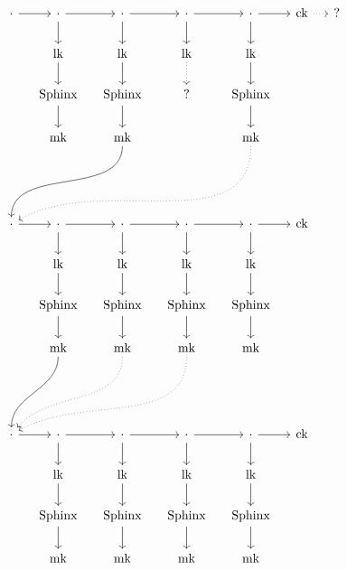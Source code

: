 \documentclass[letterpaper]{article}
\begin{document}



\def\ck{\textrm{ck}}
\def\DH{\textrm{DH}}
\def\lk{\textrm{lk}}
\def\mk{\textrm{mk}}
\def\Sphinx{\textrm{Sphinx}}
\def\name{\textrm{name}}

\[\begin{tikzcd}[ampersand replacement=\&, column sep=small]
\cdot \ar[r] \& \cdot \ar[r] \ar[d] \& \cdot \ar[r] \ar[d] \& \cdot \ar[r] \ar[d] \& \cdot \ar[r] \ar[d] \& \ck \ar[r, dotted] \& ? \& \\
 \& \lk \ar[d] \& \lk \ar[d] \& \lk \ar[d, dotted] \& \lk \ar[d] \&  \& \& \\ 
 \& \Sphinx \ar[d] \& \Sphinx \ar[d] \& ? \& \Sphinx\ar[d] \&  \& \& \\
 \& \mk \& \mk \ar[dddll, in=90, out=270] \&  \& \mk \ar[dddllll, dotted, in=30, out=270] \&  \& \& \\
\\
\\
\cdot \ar[r] \& \cdot \ar[r] \ar[d] \& \cdot \ar[r] \ar[d] \& \cdot \ar[r] \ar[d] \& \cdot \ar[r] \ar[d] \& \ck \& \& \\
 \& \lk \ar[d] \& \lk \ar[d] \& \lk \ar[d] \& \lk \ar[d] \&  \& \& \\ 
 \& \Sphinx \ar[d] \& \Sphinx \ar[d] \& \Sphinx \ar[d] \& \Sphinx\ar[d] \&  \& \& \\
 \& \mk \ar[dddl, in=90, out=270] \& \mk \ar[dddll, dotted, in=50, out=270] \& \mk \ar[dddlll, dotted, in=30, out=270] \& \mk \&  \& \& \\
\\
\\
\cdot \ar[r] \& \cdot \ar[r] \ar[d] \& \cdot \ar[r] \ar[d] \& \cdot \ar[r] \ar[d] \& \cdot \ar[r] \ar[d] \& \ck \& \& \\
 \& \lk \ar[d] \& \lk \ar[d] \& \lk \ar[d] \& \lk \ar[d] \&  \& \& \\ 
 \& \Sphinx \ar[d] \& \Sphinx \ar[d] \& \Sphinx \ar[d] \& \Sphinx\ar[d] \&  \& \& \\
 \& \mk \& \mk \& \mk \& \mk \&  \& \& \\
\end{tikzcd}\]


\end{document}
